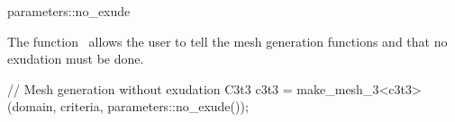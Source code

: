 \ccRefPageBegin


\begin{ccRefFunction}{parameters::no_exude}  %


\ccDefinition
  
The function \ccRefName\ allows the user to tell the mesh generation functions
 and  that no exudation must be done.





\ccExample

\begin{ccExampleCode}
// Mesh generation without exudation
C3t3 c3t3 = make_mesh_3<c3t3>(domain, criteria, parameters::no_exude());
\end{ccExampleCode}

\ccSeeAlso

 \\
 \\
 \\


\end{ccRefFunction}

\ccRefPageEnd

